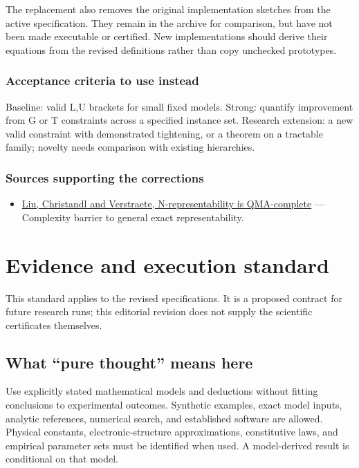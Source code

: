 \documentclass[
  11pt,
]{article}
\providecommand{\tightlist}{%
  \setlength{\itemsep}{0pt}\setlength{\parskip}{0pt}}
\begin{document}
The replacement also removes the original implementation sketches from
the active specification. They remain in the archive for comparison, but
have not been made executable or certified. New implementations should
derive their equations from the revised definitions rather than copy
unchecked prototypes.

\subsubsection{Acceptance criteria to use instead}

Baseline: valid L,U brackets for small fixed models. Strong: quantify
improvement from G or T constraints across a specified instance set.
Research extension: a new valid constraint with demonstrated tightening,
or a theorem on a tractable family; novelty needs comparison with
existing hierarchies.

\subsubsection{Sources supporting the corrections}

\begin{itemize}
\tightlist
\item
  \href{https://arxiv.org/abs/quant-ph/0609125}{Liu, Christandl and
  Verstraete, N-representability is QMA-complete} --- Complexity barrier
  to general exact representability.
\end{itemize}

\section{Evidence and execution standard}

This standard applies to the revised specifications. It is a proposed
contract for future research runs; this editorial revision does not
supply the scientific certificates themselves.

\subsection{What ``pure thought'' means here}

Use explicitly stated mathematical models and deductions without fitting
conclusions to experimental outcomes. Synthetic examples, exact model
inputs, analytic references, numerical search, and established software
are allowed. Physical constants, electronic-structure approximations,
constitutive laws, and empirical parameter sets must be identified when
used. A model-derived result is conditional on that model.
\end{document}
